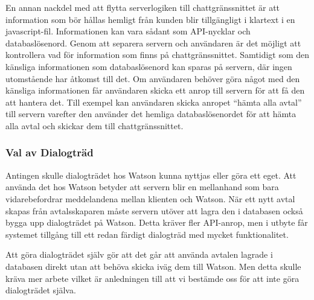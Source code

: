 \documentclass[a4paper,12pt]{article}
\begin{document}
En annan nackdel med att flytta serverlogiken till chattgränssnittet är att information som bör hållas hemligt från kunden blir tillgängligt i klartext i en javascript-fil. Informationen kan vara sådant som API-nycklar och databaslösenord. Genom att separera servern och användaren är det möjligt att kontrollera vad för information som finns på chattgränssnittet. Samtidigt som den känsliga informationen som databaslösenord kan sparas på servern, där ingen utomstående har åtkomst till det. Om användaren behöver göra något med den känsliga informationen får användaren skicka ett anrop till servern för att få den att hantera det. Till exempel kan användaren skicka anropet “hämta alla avtal” till servern varefter den använder det hemliga databaslösenordet för att hämta alla avtal och skickar dem till chattgränssnittet.

\subsubsection{Val av Dialogträd} Antingen skulle dialogträdet hos Watson kunna nyttjas eller göra ett eget. Att använda det hos Watson betyder att servern blir en mellanhand som bara vidarebefordrar meddelandena mellan klienten och Watson. När ett nytt avtal skapas från avtalsskaparen måste servern utöver att lagra den i databasen också bygga upp dialogträdet på Watson. Detta kräver fler API-anrop, men i utbyte får systemet tillgång till ett redan färdigt dialogträd med mycket funktionalitet.

Att göra dialogträdet själv gör att det går att använda avtalen lagrade i databasen direkt utan att behöva skicka iväg dem till Watson. Men detta skulle kräva mer arbete vilket är anledningen till att vi bestämde oss för att inte göra dialogträdet själva.

%
%
%
\end{document}
